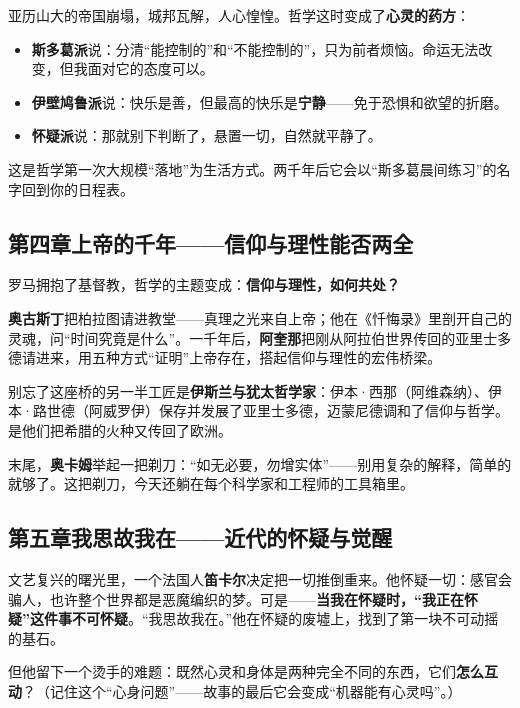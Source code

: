 \documentclass[12pt,a4paper,fontset=none]{ctexart}
\newcommand{\saying}[1]{{\notomed\color{accent}#1}}
\begin{document}
亚历山大的帝国崩塌，城邦瓦解，人心惶惶。哲学这时变成了\textbf{心灵的药方}：

\begin{itemize}[leftmargin=2.4em,itemsep=0.2em]
\item \textbf{斯多葛派}说：分清“能控制的”和“不能控制的”，只为前者烦恼。命运无法改变，但我面对它的态度可以。
\item \textbf{伊壁鸠鲁派}说：快乐是善，但最高的快乐是\textbf{宁静}——免于恐惧和欲望的折磨。
\item \textbf{怀疑派}说：那就别下判断了，悬置一切，自然就平静了。
\end{itemize}

\begin{note}
这是哲学第一次大规模“落地”为生活方式。两千年后它会以“斯多葛晨间练习”的名字回到你的日程表。
\end{note}

\subsection{第四章\quad 上帝的千年——信仰与理性能否两全}

罗马拥抱了基督教，哲学的主题变成：\textbf{信仰与理性，如何共处？}

\textbf{奥古斯丁}把柏拉图请进教堂——真理之光来自上帝；他在《忏悔录》里剖开自己的灵魂，问“时间究竟是什么”。一千年后，\textbf{阿奎那}把刚从阿拉伯世界传回的亚里士多德请进来，用五种方式“证明”上帝存在，搭起信仰与理性的宏伟桥梁。

别忘了这座桥的另一半工匠是\textbf{伊斯兰与犹太哲学家}：伊本·西那（阿维森纳）、伊本·路世德（阿威罗伊）保存并发展了亚里士多德，迈蒙尼德调和了信仰与哲学。是他们把希腊的火种又传回了欧洲。

末尾，\textbf{奥卡姆}举起一把剃刀：\saying{“如无必要，勿增实体”}——别用复杂的解释，简单的就够了。这把剃刀，今天还躺在每个科学家和工程师的工具箱里。

\subsection{第五章\quad 我思故我在——近代的怀疑与觉醒}

文艺复兴的曙光里，一个法国人\textbf{笛卡尔}决定把一切推倒重来。他怀疑一切：感官会骗人，也许整个世界都是恶魔编织的梦。可是——\textbf{当我在怀疑时，“我正在怀疑”这件事不可怀疑}。\saying{“我思故我在。”}他在怀疑的废墟上，找到了第一块不可动摇的基石。

但他留下一个烫手的难题：既然心灵和身体是两种完全不同的东西，它们\textbf{怎么互动}？（记住这个“心身问题”——故事的最后它会变成“机器能有心灵吗”。）
\end{document}
